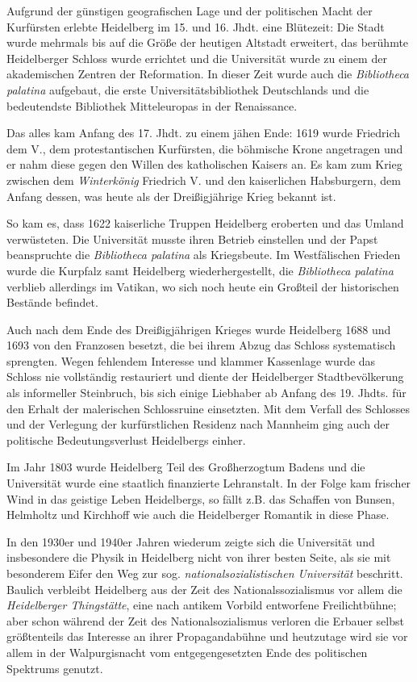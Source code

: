 Aufgrund der günstigen geografischen Lage und der politischen Macht der Kurfürsten erlebte Heidelberg im 15. und 16. Jhdt. eine Blütezeit: Die Stadt wurde mehrmals bis auf die Größe der heutigen Altstadt erweitert, das berühmte Heidelberger Schloss wurde errichtet und die Universität wurde zu einem der akademischen Zentren der Reformation. In dieser Zeit wurde auch die \textit{Bibliotheca palatina} aufgebaut, die erste Universitätsbibliothek Deutschlands und die bedeutendste Bibliothek Mitteleuropas in der Renaissance.

Das alles kam Anfang des 17. Jhdt. zu einem jähen Ende: 1619 wurde Friedrich dem V., dem protestantischen Kurfürsten, die böhmische Krone angetragen und er nahm diese gegen den Willen des katholischen Kaisers an. Es kam zum Krieg zwischen dem \textit{Winterkönig} Friedrich V. und den kaiserlichen Habsburgern, dem Anfang dessen, was heute als der Dreißigjährige Krieg bekannt ist.

So kam es, dass 1622 kaiserliche Truppen Heidelberg eroberten und das Umland verwüsteten. Die Universität musste ihren Betrieb einstellen und der Papst beanspruchte die \textit{Bibliotheca palatina} als Kriegsbeute. Im Westfälischen Frieden wurde die Kurpfalz samt Heidelberg wiederhergestellt, die \textit{Bibliotheca palatina} verblieb allerdings im Vatikan, wo sich noch heute ein Großteil der historischen Bestände befindet.

Auch nach dem Ende des Dreißigjährigen Krieges wurde Heidelberg 1688 und 1693 von den Franzosen besetzt, die bei ihrem Abzug das Schloss systematisch sprengten. Wegen fehlendem Interesse und klammer Kassenlage wurde das Schloss nie vollständig restauriert und diente der Heidelberger Stadtbevölkerung als informeller Steinbruch, bis sich einige Liebhaber ab Anfang des 19. Jhdts. für den Erhalt der malerischen Schlossruine einsetzten. Mit dem Verfall des Schlosses und der Verlegung der kurfürstlichen Residenz nach Mannheim ging auch der politische Bedeutungsverlust Heidelbergs einher.

Im Jahr 1803 wurde Heidelberg Teil des Großherzogtum Badens und die Universität wurde eine staatlich finanzierte Lehranstalt. In der Folge kam frischer Wind in das geistige Leben Heidelbergs, so fällt z.B. das Schaffen von Bunsen, Helmholtz und Kirchhoff wie auch die Heidelberger Romantik in diese Phase.

In den 1930er und 1940er Jahren wiederum zeigte sich die Universität und insbesondere die Physik in Heidelberg nicht von ihrer besten Seite, als sie mit besonderem Eifer den Weg zur sog. \textit{nationalsozialistischen Universität} beschritt. Baulich verbleibt Heidelberg aus der Zeit des Nationalssozialismus vor allem die \textit{Heidelberger Thingstätte}, eine nach antikem Vorbild entworfene Freilichtbühne; aber schon während der Zeit des Nationalsozialismus verloren die Erbauer selbst größtenteils das Interesse an ihrer Propagandabühne und heutzutage wird sie vor allem in der Walpurgisnacht vom entgegengesetzten Ende des politischen Spektrums genutzt.

